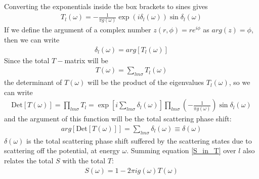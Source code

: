 \documentclass[12pt,twoside]{report}
\numberwithin{equation}{section}
\begin{document}
Converting the exponentials inside the box brackets to sines gives
\begin{equation}\begin{aligned}
	\label{tmatphase}
	T_l(\omega) = -\frac{1}{\pi g(\omega)}\exp\left(i \delta_l(\omega) \right)\sin \delta_l(\omega)
\end{aligned}\end{equation}
If we define the argument of a complex number \(z(r,\phi) = r e^{i\phi}\) as \(arg(z) = \phi\), then we can write
\begin{equation}\begin{aligned}
	\delta_l(\omega) = arg\left[ T_l(\omega) \right] 
\end{aligned}\end{equation}
Since the total \(T-\)matrix will be 
\begin{equation}\begin{aligned}
	T(\omega) = \sum_{lm\sigma} T_l(\omega)
\end{aligned}\end{equation}
the determinant of \(T(\omega)\) will be the product of the eigenvalues \(T_l(\omega)\), so we can write
\begin{equation}\begin{aligned}
	\text{Det}\left[ T(\omega) \right] = \prod_{lm\sigma} T_l = \exp\left[ i\sum_{lm\sigma} \delta_l(\omega) \right] \prod_{lm\sigma}\left( -\frac{1}{\pi g(\omega)}\right)\sin \delta_l(\omega)
\end{aligned}\end{equation}
and the argument of this function will be the total scattering phase shift:
\begin{equation}\begin{aligned}
	\label{phase_in_T}
	arg\left[\text{Det}\left[ T(\omega) \right]\right] = \sum_{lm\sigma} \delta_l(\omega) \equiv \delta(\omega)
\end{aligned}\end{equation}
\(\delta(\omega)\) is the total scattering phase shift suffered by the scattering states due to scattering off the potential, at energy \(\omega\).
\pb Summing equation \ref{S_in_T} over \(l\) also relates the total \(S\) with the total \(T\):
\begin{equation}\begin{aligned}
	S(\omega) = 1 - 2\pi i g(\omega) T(\omega)
\end{aligned}\end{equation}
\end{document}

